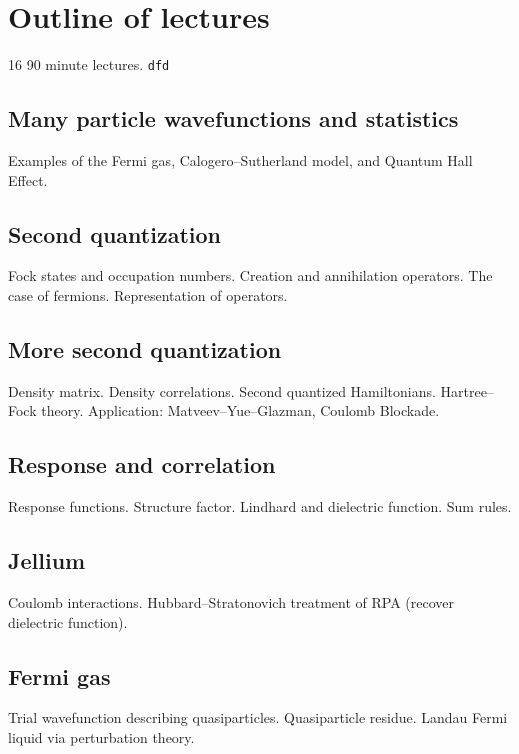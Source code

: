 \section{Outline of lectures}

16 90 minute lectures. \verb|dfd|

\subsection{Many particle wavefunctions and statistics}

Examples of the Fermi gas, Calogero--Sutherland model, and Quantum Hall Effect. \textbf{}

\subsection{Second quantization}

Fock states and occupation numbers. Creation and annihilation operators. The case of fermions. Representation of operators.

\subsection{More second quantization}

Density matrix. Density correlations. Second quantized Hamiltonians. Hartree--Fock theory. Application: Matveev--Yue--Glazman, Coulomb Blockade.

\subsection{Response and correlation}

Response functions. Structure factor. Lindhard and dielectric function. Sum rules.

\subsection{Jellium}

Coulomb interactions. Hubbard--Stratonovich treatment of RPA (recover dielectric function).

\subsection{Fermi gas}

Trial wavefunction describing quasiparticles. Quasiparticle residue. Landau Fermi liquid via perturbation theory. 


